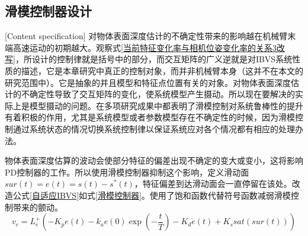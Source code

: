 \documentclass[fontset=fandol,type=bachelor,campus=harbin,bsmainpagenumberline=true]{hithesisbook}
\begin{document}
\subsection{滑模控制器设计}[Content specification]
对物体表面深度估计的不确定性带来的影响越在机械臂末端高速运动的初期越大。观察式\ref{当前特征变化率与相机位姿变化率的关系3改写}，所设计的控制律就是括号中的部分，而交互矩阵的广义逆就是对IBVS系统性质的描述，它是本章研究中真正的控制对象，而并非机械臂本身（这并不在本文的研究范围中）。它是抽象的并且模型和特征点位置有关的对象。对物体表面深度估计的不确定性导致了交互矩阵的变化，使系统模型产生摄动。所以现在要解决的实际上是模型摄动的问题。在多项研究成果中都表明了滑模控制对系统鲁棒性的提升有着积极的作用\cite{yuksel2015ibvs,parsapour2013position}，尤其是系统模型或者参数模型存在不确定性的时候，因为滑模控制通过系统状态的情况切换系统控制律以保证系统应对各个情况都有相应的处理办法。


物体表面深度估算的波动会使部分特征的偏差出现不确定的变大或变小，这将影响PD控制器的工作。所以使用滑模控制器\cite{li2018enhanced}抑制这个影响，定义滑动面$sur\left( t \right) =e\left( t \right) =s\left( t \right) -s^*\left( t \right) $，特征偏差到达滑动面会一直停留在该处。改造公式\ref{自适应IBVS}如式\ref{滑模控制器}。使用了饱和函数代替符号函数减弱滑模控制带来的颤动。
\begin{equation}
v_c=L_{e}^{+}\left( -K_pe\left( t \right) -k_ae\left( 0 \right) \exp \left( -\frac{t}{T} \right) -K_d\dot{e}\left( t \right) +K_ssat\left( sur\left( t \right) \right) \right) 
\label{滑模控制器}
\end{equation}
\end{document}

